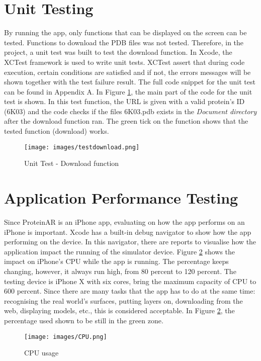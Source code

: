 \section{Unit Testing}
By running the app, only functions that can be displayed on the screen can be tested. Functions to download the PDB files was not tested. Therefore, in the project, a unit test was built to test the download function. 
In Xcode, the XCTest framework is used to write unit tests. XCTest assert that during code execution, certain conditions are satisfied and if not, the errors messages will be shown together with the test failure result. 
The full code snippet for the unit test can be found in Appendix A. In Figure \ref{fig:testdownload}, the main part of the code for the unit test is shown. In this test function, the URL is given with a valid protein's ID (6K03) and the code checks if the files 6K03.pdb exists in the \emph{Document directory} after the download function ran. The green tick on the function shows that the tested function (download) works. 

 \begin{figure}[!htp]
	\centering
	\texttt{[image: images/testdownload.png]}
	\caption{Unit Test - Download function}
	\label{fig:testdownload}
\end{figure}

\section{Application Performance Testing}
Since ProteinAR is an iPhone app, evaluating on how the app performs on an iPhone is important. Xcode has a built-in debug navigator to show how the app performing on the device. In this navigator, there are reports to visualise how the application impact the running of the simulator device. 
Figure \ref{fig:cpu} shows the impact on iPhone's CPU while the app is running. The percentage keeps changing, however, it always run high, from 80 percent to 120 percent. The testing device is iPhone X with six cores, bring the maximum capacity of CPU to 600 percent. Since there are many tasks that the app has to do at the same time: recognising the real world's surfaces, putting layers on, downloading from the web, displaying models, etc., this is considered acceptable. In Figure \ref{fig:cpu}, the percentage used shown to be still in the green zone. 
 \begin{figure}[!htp]
	\centering
	\texttt{[image: images/CPU.png]}
	\caption{CPU usage}
	\label{fig:cpu}
\end{figure}

